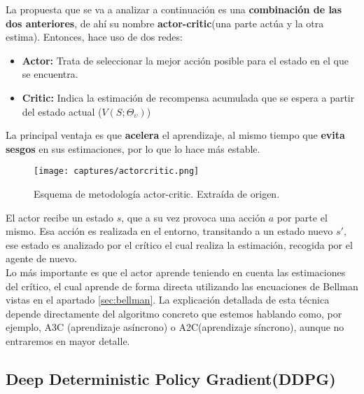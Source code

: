\documentclass[11pt,fleqn]{book} %
\begin{document}
La propuesta que se va a analizar a continuación es una \textbf{combinación de las dos anteriores}, de ahí su nombre \textbf{actor-critic}(una parte actúa y la otra estima). Entonces, hace uso de dos redes: \\

\begin{itemize}
	\item \textbf{Actor:} Trata de seleccionar la mejor acción posible para el estado en el que se encuentra.\\
	
	\item \textbf{Critic:} Indica la estimación de recompensa acumulada que se espera a partir del estado actual ($V(S;\Theta_\upsilon)$) \\
\end{itemize}

La principal ventaja es que \textbf{acelera} el aprendizaje, al mismo tiempo que \textbf{evita sesgos} en sus estimaciones, por lo que lo hace más estable.

\begin{figure}[H]
	\centering\texttt{[image: captures/actorcritic.png]}
	\caption{Esquema de metodología actor-critic. Extraída de origen. \cite{article:RLromero}}
	\label{fig:actorcritic} %
\end{figure}

El actor recibe un estado $s$, que a su vez provoca una acción $a$ por parte el mismo. Esa acción es realizada en el entorno, transitando a un estado nuevo $s'$, ese estado es analizado por el crítico el cual realiza la estimación, recogida por el agente de nuevo. \\

Lo más importante es que el actor aprende teniendo en cuenta las estimaciones del crítico, el cual aprende de forma directa utilizando las encuaciones de Bellman vistas en el apartado \ref{sec:bellman}. La explicación detallada de esta técnica depende directamente del algoritmo concreto que estemos hablando como, por ejemplo, A3C (aprendizaje asíncrono) o A2C(aprendizaje síncrono), aunque no entraremos en mayor detalle.

\subsection{Deep Deterministic Policy Gradient(DDPG)}
\end{document}
